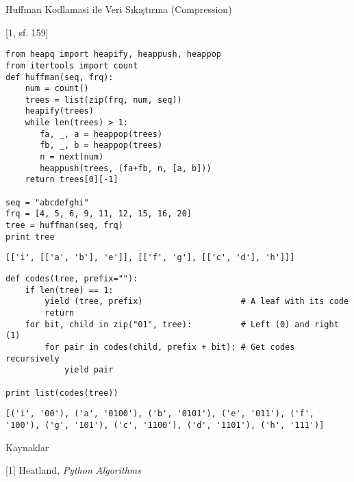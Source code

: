 \documentclass[12pt,fleqn]{article}\usepackage{../../common}
\begin{document}
Huffman Kodlamasi ile Veri Sıkıştırma (Compression)

[1, sf. 159]

\begin{verbatim}
from heapq import heapify, heappush, heappop
from itertools import count
def huffman(seq, frq):
    num = count()
    trees = list(zip(frq, num, seq))
    heapify(trees)
    while len(trees) > 1:
       fa, _, a = heappop(trees)
       fb, _, b = heappop(trees)
       n = next(num)
       heappush(trees, (fa+fb, n, [a, b]))
    return trees[0][-1]

seq = "abcdefghi"
frq = [4, 5, 6, 9, 11, 12, 15, 16, 20]
tree = huffman(seq, frq)
print tree
\end{verbatim}

\begin{verbatim}
[['i', [['a', 'b'], 'e']], [['f', 'g'], [['c', 'd'], 'h']]]
\end{verbatim}

\begin{verbatim}
def codes(tree, prefix=""):
    if len(tree) == 1:
        yield (tree, prefix)                    # A leaf with its code
        return
    for bit, child in zip("01", tree):          # Left (0) and right (1)
        for pair in codes(child, prefix + bit): # Get codes recursively
            yield pair
	    
print list(codes(tree))
\end{verbatim}

\begin{verbatim}
[('i', '00'), ('a', '0100'), ('b', '0101'), ('e', '011'), ('f', '100'), ('g', '101'), ('c', '1100'), ('d', '1101'), ('h', '111')]
\end{verbatim}

Kaynaklar

[1] Heatland, {\em Python Algorithms}
\end{document}

